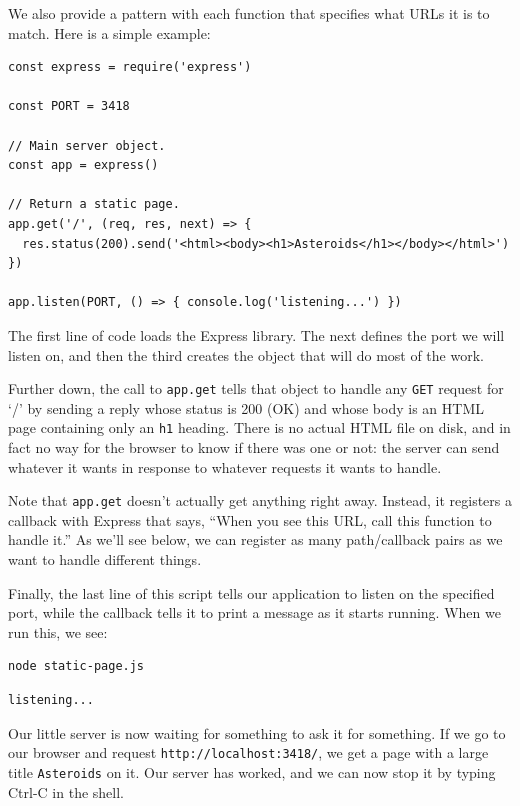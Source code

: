 We also provide a pattern with each function that specifies what URLs it
is to match. Here is a simple example:

\begin{verbatim}
const express = require('express')

const PORT = 3418

// Main server object.
const app = express()

// Return a static page.
app.get('/', (req, res, next) => {
  res.status(200).send('<html><body><h1>Asteroids</h1></body></html>')
})

app.listen(PORT, () => { console.log('listening...') })
\end{verbatim}

The first line of code loads the Express library. The next defines the
port we will listen on, and then the third creates the object that will
do most of the work.

Further down, the call to \texttt{app.get} tells that object to handle
any \texttt{GET} request for `/' by sending a reply whose status is 200
(OK) and whose body is an HTML page containing only an \texttt{h1}
heading. There is no actual HTML file on disk, and in fact no way for
the browser to know if there was one or not: the server can send
whatever it wants in response to whatever requests it wants to handle.

Note that \texttt{app.get} doesn't actually get anything right away.
Instead, it registers a callback with Express that says, ``When you see
this URL, call this function to handle it.'' As we'll see below, we can
register as many path/callback pairs as we want to handle different
things.

Finally, the last line of this script tells our application to listen on
the specified port, while the callback tells it to print a message as it
starts running. When we run this, we see:

\begin{verbatim}
node static-page.js
\end{verbatim}

\begin{verbatim}
listening...
\end{verbatim}

Our little server is now waiting for something to ask it for something.
If we go to our browser and request \texttt{http://localhost:3418/}, we
get a page with a large title \texttt{Asteroids} on it. Our server has
worked, and we can now stop it by typing Ctrl-C in the shell.

